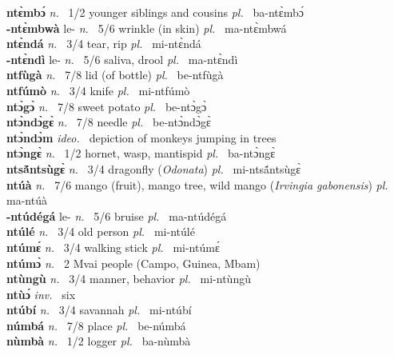 {\bfseries ntɛ̀mbɔ́}  {\itshape n.~} 1/2 younger siblings and cousins {\itshape pl.~} ba-ntɛ̀mbɔ́    \\ 
{\bfseries -ntɛ̀mbwà} le- {\itshape n.~} 5/6 wrinkle (in skin) {\itshape pl.~} ma-ntɛ̀mbwá    \\ 
{\bfseries ntɛ̀ndá}  {\itshape n.~} 3/4 tear, rip {\itshape pl.~} mi-ntɛ̀ndá    \\ 
{\bfseries -ntɛ̀ndì} le- {\itshape n.~} 5/6 saliva, drool {\itshape pl.~} ma-ntɛ̀ndì    \\ 
{\bfseries ntfùgà}  {\itshape n.~} 7/8 lid (of bottle) {\itshape pl.~} be-ntfùgà    \\ 
{\bfseries ntfúmò}  {\itshape n.~} 3/4 knife {\itshape pl.~} mi-ntfúmò    \\ 
{\bfseries ntɔ̀gɔ̀}  {\itshape n.~} 7/8 sweet potato {\itshape pl.~} be-ntɔ̀gɔ̀   \\ 
{\bfseries ntɔ̀ndɔ̀gɛ̀}  {\itshape n.~} 7/8 needle {\itshape pl.~} be-ntɔ̀ndɔ̀gɛ̀    \\ 
{\bfseries ntɔ̀ndɔ̀m}  {\itshape ideo.~} depiction of monkeys jumping in trees    \\ 
{\bfseries ntɔ̀ngɛ̀}  {\itshape n.~} 1/2 hornet, wasp, mantispid {\itshape pl.~} ba-ntɔ̀ngɛ̀    \\ 
{\bfseries ntsã́ntsùgɛ̀}  {\itshape n.~} 3/4 dragonfly ({\itshape Odonata}) {\itshape pl.~} mi-ntsã́ntsùgɛ̀    \\ 
{\bfseries ntúà}  {\itshape n.~} 7/6 mango (fruit),  mango tree, wild mango ({\itshape Irvingia gabonensis}) {\itshape pl.~} ma-ntúà    \\ 
{\bfseries -ntúdégá} le- {\itshape n.~} 5/6 bruise {\itshape pl.~} ma-ntúdégá    \\ 
{\bfseries ntúlé}  {\itshape n.~} 3/4 old person {\itshape pl.~} mi-ntúlé    \\ 
{\bfseries ntúmɛ́}  {\itshape n.~} 3/4 walking stick {\itshape pl.~} mi-ntúmɛ́    \\ 
{\bfseries ntúmɔ̀}  {\itshape n.~} 2 Mvai people (Campo, Guinea, Mbam)    \\ 
{\bfseries ntùngù}  {\itshape n.~} 3/4 manner, behavior {\itshape pl.~} mi-ntùngù    \\ 
{\bfseries ntùɔ́}  {\itshape inv.~} six    \\ 
{\bfseries ntúbí}  {\itshape n.~} 3/4 savannah {\itshape pl.~} mi-ntúbí    \\ 
{\bfseries númbá}  {\itshape n.~} 7/8 place {\itshape pl.~} be-númbá    \\ 
{\bfseries nùmbà}  {\itshape n.~} 1/2 logger {\itshape pl.~} ba-nùmbà    \\ 
